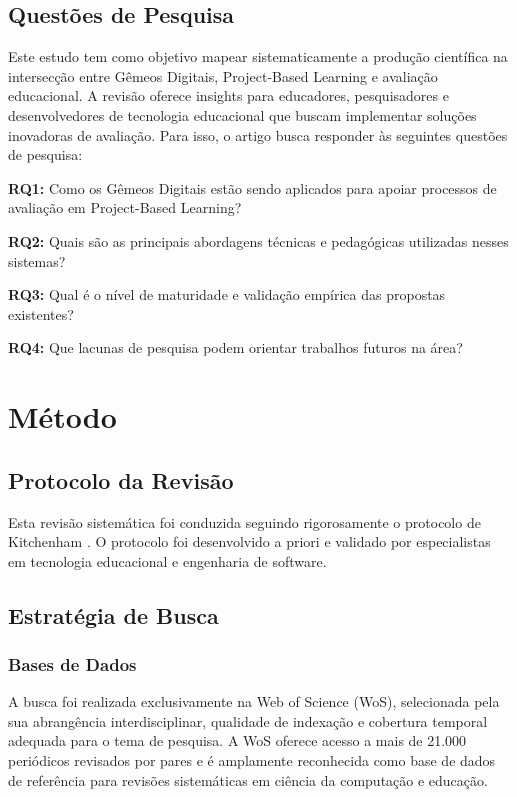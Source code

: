 \documentclass[english, spanish, brazilian]{RBIEarticle} %
\begin{document}
\subsection{Questões de Pesquisa}

Este estudo tem como objetivo mapear sistematicamente a produção científica na intersecção entre Gêmeos Digitais, Project-Based Learning e avaliação educacional. A revisão oferece insights para educadores, pesquisadores e desenvolvedores de tecnologia educacional que buscam implementar soluções inovadoras de avaliação. Para isso, o artigo busca responder às seguintes questões de pesquisa:

\textbf{RQ1:} Como os Gêmeos Digitais estão sendo aplicados para apoiar processos de avaliação em Project-Based Learning?

\textbf{RQ2:} Quais são as principais abordagens técnicas e pedagógicas utilizadas nesses sistemas?

\textbf{RQ3:} Qual é o nível de maturidade e validação empírica das propostas existentes?

\textbf{RQ4:} Que lacunas de pesquisa podem orientar trabalhos futuros na área?

\section{Método}

\subsection{Protocolo da Revisão}

Esta revisão sistemática foi conduzida seguindo rigorosamente o protocolo de Kitchenham \parencite{Kitchenham2007}. O protocolo foi desenvolvido a priori e validado por especialistas em tecnologia educacional e engenharia de software.

\subsection{Estratégia de Busca}

\subsubsection{Bases de Dados}

A busca foi realizada exclusivamente na Web of Science (WoS), selecionada pela sua abrangência interdisciplinar, qualidade de indexação e cobertura temporal adequada para o tema de pesquisa. A WoS oferece acesso a mais de 21.000 periódicos revisados por pares e é amplamente reconhecida como base de dados de referência para revisões sistemáticas em ciência da computação e educação.
\end{document}
